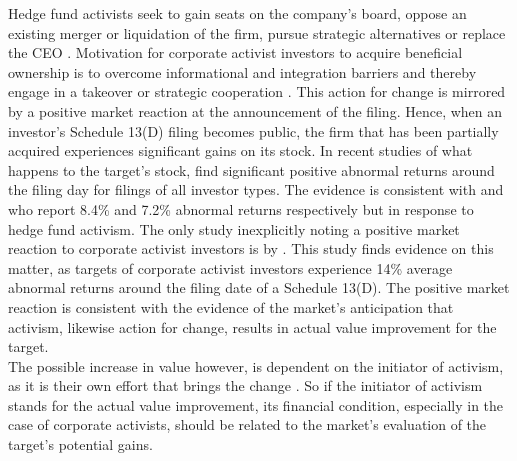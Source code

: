 \documentclass[12pt]{article}
\begin{document}
Hedge fund activists seek to gain seats on the company's board, oppose an existing merger or liquidation of the firm, pursue strategic alternatives or replace the CEO \citep[p.188]{Klein2009}. Motivation for corporate activist investors to acquire beneficial ownership is to overcome informational and integration barriers and thereby engage in a takeover or strategic cooperation \citep[p.1]{Huang2017}. 
This action for change is mirrored by a positive market reaction at the announcement of the filing. Hence, when an investor's Schedule 13(D) filing becomes public, the firm that has been partially acquired experiences significant gains on its stock. In recent studies of what happens to the target's stock, \citet[p.1564]{Collin-Dufresne2015} find significant positive abnormal returns around the filing day for filings of all investor types. The evidence is consistent with \citet[p.1756]{Brav2008} and \citet[p.209]{Klein2009} who report 8.4\% and 7.2\% abnormal returns respectively but in response to hedge fund activism.
The only study inexplicitly noting a positive market reaction to corporate activist investors is by \citet[p.29]{Brigida2012}. This study finds evidence on this matter, as targets of corporate activist investors experience 14\% average abnormal returns around the filing date of a Schedule 13(D). The positive market reaction is consistent with the evidence of the market's anticipation that activism, likewise action for change, results in actual value improvement for the target.\\
The possible increase in value however, is dependent on the initiator of activism, as it is their own effort that brings the change \citep[p.1563]{Collin-Dufresne2015}. So if the initiator of activism stands for the actual value improvement, its financial condition, especially in the case of corporate activists, should be related to the market's evaluation of the target's potential gains.
\end{document}

